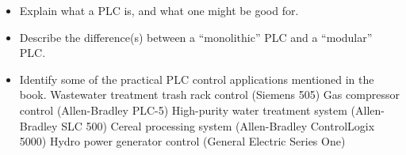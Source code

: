 \begin{itemize}
\item{} Explain what a PLC is, and what one might be good for.
\item{} Describe the difference(s) between a ``monolithic'' PLC and a ``modular'' PLC.
\item{} Identify some of the practical PLC control applications mentioned in the book.
\itemitem{} Wastewater treatment trash rack control (Siemens 505)
\itemitem{} Gas compressor control (Allen-Bradley PLC-5)
\itemitem{} High-purity water treatment system (Allen-Bradley SLC 500)
\itemitem{} Cereal processing system (Allen-Bradley ControlLogix 5000)
\itemitem{} Hydro power generator control (General Electric Series One)
\end{itemize}



